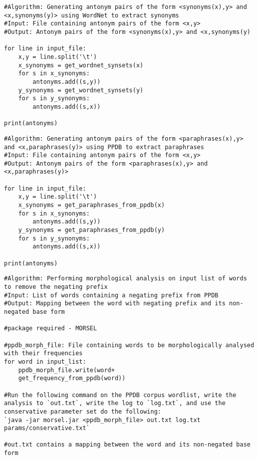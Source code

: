 \documentclass[11pt]{article}
\begin{document}
\begin{lstlisting}
#Algorithm: Generating antonym pairs of the form <synonyms(x),y> and <x,synonyms(y)> using WordNet to extract synonyms
#Input: File containing antonym pairs of the form <x,y>
#Output: Antonym pairs of the form <synonyms(x),y> and <x,synonyms(y)

for line in input_file:
    x,y = line.split('\t')
    x_synonyms = get_wordnet_synsets(x)
    for s in x_synonyms:
        antonyms.add((s,y))
    y_synonyms = get_wordnet_synsets(y)
    for s in y_synonyms:
        antonyms.add((s,x))
        
print(antonyms)
\end{lstlisting}

\begin{lstlisting}
#Algorithm: Generating antonym pairs of the form <paraphrases(x),y> and <x,paraphrases(y)> using PPDB to extract paraphrases
#Input: File containing antonym pairs of the form <x,y>
#Output: Antonym pairs of the form <paraphrases(x),y> and <x,paraphrases(y)>

for line in input_file:
    x,y = line.split('\t')
    x_synonyms = get_paraphrases_from_ppdb(x)
    for s in x_synonyms:
        antonyms.add((s,y))
    y_synonyms = get_paraphrases_from_ppdb(y)
    for s in y_synonyms:
        antonyms.add((s,x))
        
print(antonyms)
\end{lstlisting}

\begin{lstlisting}
#Algorithm: Performing morphological analysis on input list of words to remove the negating prefix
#Input: List of words containing a negating prefix from PPDB
#Output: Mapping between the word with negating prefix and its non-negated base form

#package required - MORSEL

#ppdb_morph_file: File containing words to be morphologically analysed with their frequencies
for word in input_list:
    ppdb_morph_file.write(word+
    get_frequency_from_ppdb(word))
    
#Run the following command on the PPDB corpus wordlist, write the analysis to `out.txt`, write the log to `log.txt`, and use the conservative parameter set do the following:
`java -jar morsel.jar <ppdb_morph_file> out.txt log.txt params/conservative.txt`

#out.txt contains a mapping between the word and its non-negated base form
\end{lstlisting}
\end{document}
